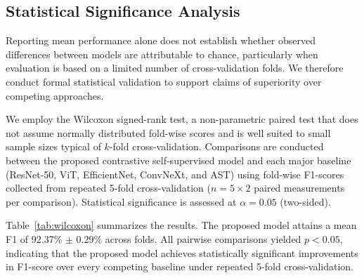 \subsection{Statistical Significance Analysis}

Reporting mean performance alone does not establish whether observed differences between models are attributable to chance, particularly when evaluation is based on a limited number of cross-validation folds. We therefore conduct formal statistical validation to support claims of superiority over competing approaches.

We employ the Wilcoxon signed-rank test, a non-parametric paired test that does not assume normally distributed fold-wise scores and is well suited to small sample sizes typical of $k$-fold cross-validation. Comparisons are conducted between the proposed contrastive self-supervised model and each major baseline (ResNet-50, ViT, EfficientNet, ConvNeXt, and AST) using fold-wise F1-scores collected from repeated 5-fold cross-validation ($n = 5 \times 2$ paired measurements per comparison). Statistical significance is assessed at $\alpha = 0.05$ (two-sided).

Table~\ref{tab:wilcoxon} summarizes the results. The proposed model attains a mean F1 of 92.37\% $\pm$ 0.29\% across folds. All pairwise comparisons yielded $p < 0.05$, indicating that the proposed model achieves statistically significant improvements in F1-score over every competing baseline under repeated 5-fold cross-validation.



